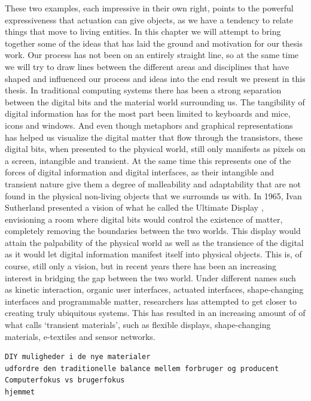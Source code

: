 These two examples, each impressive in their own right, points to the powerful expressiveness that actuation can give objects, as we have a tendency to relate things that move to living entities. 
\blank
In this chapter we will attempt to bring together some of the ideas that has laid the ground and motivation for our thesis work.
Our process has not been on an entirely straight line, so at the same time we will try to draw lines between the different areas and disciplines that have shaped and influenced our process and ideas into the end result we present in this thesis.  
\blank
In traditional computing systems there has been a strong separation between the digital bits and the material world surrounding us.
The tangibility of digital information has for the most part been limited to keyboards and mice, icons and windows. 
And even though metaphors and graphical representations has helped us visualize the digital matter that flow through the transistors, these digital bits, when presented to the physical world, still only manifests as pixels on a screen, intangible and transient.
At the same time this represents one of the forces of digital information and digital interfaces, as their intangible and transient nature give them a degree of malleability and adaptability that are not found in the physical non-living objects that we surrounds us with. 
\blank
In 1965, Ivan Sutherland presented a vision of what he called the Ultimate Display \citep{sutherland1965ultimate}, envisioning a room where digital bits would control the existence of matter, completely removing the boundaries between the two worlds.
This display would attain the palpability of the physical world as well as the transience of the digital as it would let digital information manifest itself into physical objects.
This is, of course, still only a vision, but in recent years there has been an increasing interest in bridging the gap between the two world.
Under different names such as kinetic interaction, organic user interfaces, actuated interfaces, shape-changing interfaces and programmable matter, researchers has attempted to get closer to creating truly ubiquitous systems.    
This has resulted in an increasing amount of of what \citet{coelho2009programming} calls `transient materials', such as flexible displays, shape-changing materials, e-textiles and sensor networks.
\blank
\begin{verbatim}
DIY muligheder i de nye materialer
udfordre den traditionelle balance mellem forbruger og producent
Computerfokus vs brugerfokus
hjemmet
\end{verbatim}

